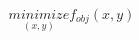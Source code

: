 \documentclass[preview]{standalone}
\begin{document}
\begin{align*}
\underset{(x,y)}{minimize} f_{obj}(x,y)
\end{align*}
\end{document}
